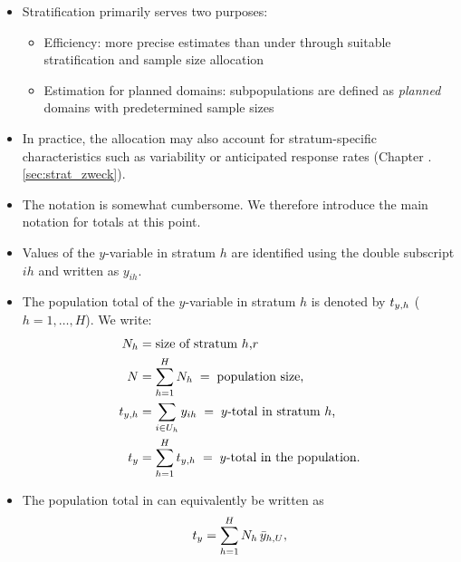 \documentclass{my_eth_beamer}
\numberwithin{equation}{section}
\begin{document}
\begin{frame}
    \begin{itemize}
    \setlength{\itemsep}{8pt}
        \item Stratification \alert{primarily} serves \alert{two purposes}:
            \vspace{0.25em}
            \begin{itemize}
            \setlength{\itemsep}{4pt}
                \item \alert{Efficiency:} more precise estimates than under \SRS
                    through suitable stratification and sample size allocation
                \item \alert{Estimation for planned domains:} subpopulations are
                defined as \emph{planned} domains with predetermined sample sizes
            \end{itemize}
        \item In practice, the allocation may also account for stratum-specific
            characteristics such as variability or anticipated response rates
            (Chapter \insertsectionnumber.\ref{sec:strat_zweck}).
       \item The \alert{notation} is somewhat \alert{cumbersome}. We therefore
           introduce the main notation for totals at this point.
        \item Values of the $y$-variable in stratum $h$ are identified using
            the \alert{double subscript} $ih$ and written as $y_{ih}$.
    \end{itemize}
\end{frame}

\begin{frame}
    \begin{itemize}
        \item The \alert{population total} of the $y$-variable \alert{in
            stratum} $h$ is denoted by $t_{y,h}$ ($h = 1, \ldots, H$). We write:
        \vspace{-0.5em}
        \begin{align*}
            N_{h} &= \text{size of stratum $h$,} r\\
            N &= \sum_{h = 1}^H N_{h} \; = \; \text{population size,}\\
            t_{y,h} &= \sum_{i \in U_h} y_{ih} \; = \;
                \text{$y$-total in stratum $h$,}\\
            t_y &= \sum_{h = 1}^H t_{y,h} \; = \;
                \text{$y$-total in the population.}
        \end{align*}
        \item The \alert{population total} in can equivalently be written as
            \vspace{-0.5em}
            \begin{equation*}
                t_y = \sum_{h=1}^H N_{h} \, \bar{y}_{h,U},
            \end{equation*}
    \end{itemize}
\end{frame}
\end{document}
